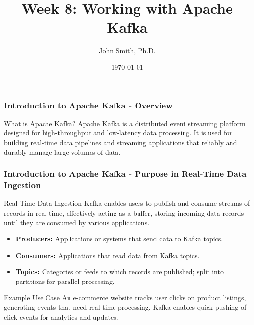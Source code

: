 \documentclass[aspectratio=169]{beamer}
\title[Apache Kafka]{Week 8: Working with Apache Kafka}
\author[J. Smith]{John Smith, Ph.D.}
\institute[University Name]{
  Department of Computer Science\\
  University Name\\
  \vspace{0.3cm}
  Email: email@university.edu\\
  Website: www.university.edu
}
\date{\today}
\begin{document}
\frame{\titlepage}

\begin{frame}[fragile]
    \frametitle{Introduction to Apache Kafka - Overview}
    \begin{block}{What is Apache Kafka?}
        Apache Kafka is a distributed event streaming platform designed for high-throughput and low-latency data processing. It is used for building real-time data pipelines and streaming applications that reliably and durably manage large volumes of data.
    \end{block}
\end{frame}

\begin{frame}[fragile]
    \frametitle{Introduction to Apache Kafka - Purpose in Real-Time Data Ingestion}
    \begin{block}{Real-Time Data Ingestion}
        Kafka enables users to publish and consume streams of records in real-time, effectively acting as a buffer, storing incoming data records until they are consumed by various applications.
    \end{block}
    
    \begin{itemize}
        \item \textbf{Producers:} Applications or systems that send data to Kafka topics.
        \item \textbf{Consumers:} Applications that read data from Kafka topics.
        \item \textbf{Topics:} Categories or feeds to which records are published; split into partitions for parallel processing.
    \end{itemize}
    
    \begin{block}{Example Use Case}
        An e-commerce website tracks user clicks on product listings, generating events that need real-time processing. Kafka enables quick pushing of click events for analytics and updates.
    \end{block}
\end{frame}
\end{document}
